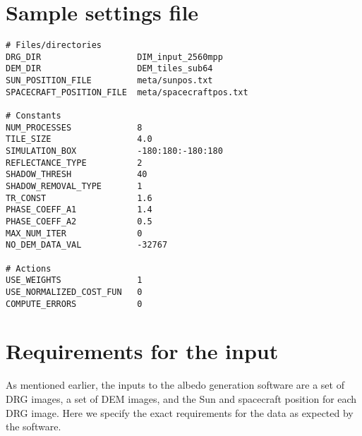 \documentclass{article}
\begin{document}
\section{Sample settings file}

\begin{verbatim}
# Files/directories
DRG_DIR                   DIM_input_2560mpp
DEM_DIR                   DEM_tiles_sub64
SUN_POSITION_FILE         meta/sunpos.txt
SPACECRAFT_POSITION_FILE  meta/spacecraftpos.txt

# Constants
NUM_PROCESSES             8
TILE_SIZE                 4.0
SIMULATION_BOX            -180:180:-180:180
REFLECTANCE_TYPE          2
SHADOW_THRESH             40
SHADOW_REMOVAL_TYPE       1
TR_CONST                  1.6
PHASE_COEFF_A1            1.4
PHASE_COEFF_A2            0.5
MAX_NUM_ITER              0
NO_DEM_DATA_VAL           -32767

# Actions
USE_WEIGHTS               1
USE_NORMALIZED_COST_FUN   0
COMPUTE_ERRORS            0
\end{verbatim}


\section{Requirements for the input}

As mentioned earlier, the inputs to the albedo generation software are a set of DRG images, a set of DEM images, and the Sun and spacecraft position for each DRG image. Here we specify the exact requirements for the data as expected by the software.
\end{document}
